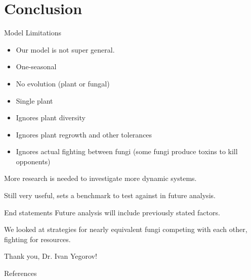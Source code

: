 \documentclass{beamer}
\begin{document}
\section{Conclusion}
\begin{frame}{Model Limitations}
    \begin{itemize}
        \item Our model is not super general.\pause
        \item One-seasonal\pause
        \item No evolution (plant or fungal)\pause
        \item Single plant\pause
        \item Ignores plant diversity \pause
        \item Ignores plant regrowth and other tolerances\pause
        \item Ignores actual fighting between fungi (some fungi produce toxins to kill opponents)\pause
    \end{itemize}
    
    \vspace{.4cm}More research is needed to investigate more dynamic systems.\newline
    
    Still very useful, sets a benchmark to test against in future analysis.
\end{frame}


\begin{frame}{End statements}
    Future analysis will include previously stated factors.\newline\pause
    
    We looked at strategies for nearly equivalent fungi competing with each other, fighting for resources. \newline
    
    Thank you, Dr. Ivan Yegorov!
    
\end{frame}

\begin{frame}{References}
    
    
\end{frame}
\end{document}
